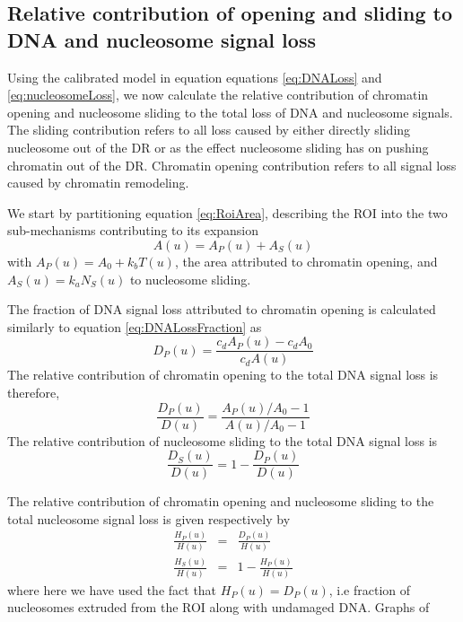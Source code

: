 \documentclass[12pt]{article}
\begin{document}
			

\subsection{Relative contribution of opening and sliding to DNA
	and nucleosome signal loss}

Using the calibrated model in equation equations \eqref{eq:DNALoss} and \eqref{eq:nucleosomeLoss}, we now calculate the
relative contribution of chromatin opening and nucleosome sliding to the
total loss of DNA and nucleosome signals. The sliding contribution refers to all loss
caused by either directly sliding nucleosome out of the DR or as the effect
nucleosome sliding has on pushing chromatin out of the DR. Chromatin opening contribution refers to all signal loss caused by chromatin remodeling.

We start by partitioning equation \eqref{eq:RoiArea}, describing the ROI into the two sub-mechanisms contributing to its expansion 
\begin{equation*}
A(u) = A_P(u) +A_S(u)
\end{equation*}
with $A_P(u)=A_0+k_bT(u)$, the area attributed to chromatin opening, and $A_S(u)=k_aN_S(u)$ to nucleosome sliding. 

The fraction of DNA signal loss attributed to chromatin opening is calculated similarly to equation \eqref{eq:DNALossFraction} as 
\begin{equation*}
D_P(u)=\frac{c_dA_P(u)-c_dA_0}{c_dA(u)}
\end{equation*}
The relative contribution of chromatin opening to the total DNA signal loss is therefore,
\begin{equation}\label{eq:relativeOpeningDNA}
\frac{D_P(u)}{D(u)}=\frac{A_P(u)/A_0-1}{A(u)/A_0-1}
\end{equation}	
The relative contribution of nucleosome sliding to the total DNA signal loss is
\begin{equation}\label{eq:relativeSlidingDNA}
\frac{D_S(u)}{D(u)}=1-\frac{D_P(u)}{D(u)}
\end{equation}

The relative contribution of chromatin opening and nucleosome
sliding to the total nucleosome signal loss is given respectively by
\begin{eqnarray}
\frac{H_P(u)}{H(u)} &=& \frac{D_P(u)}{H(u)}\label{eq:relativeOpeningNucleosomes}\\
\frac{H_S(u)}{H(u)} &=&1-\frac{H_P(u)}{H(u)} \label{eq:relativeSlidingNucleosomes}
\end{eqnarray}
where here we have used the fact that $H_P(u) = D_P(u)$, i.e fraction of nucleosomes extruded from the ROI along with undamaged DNA. Graphs of
\end{document}
